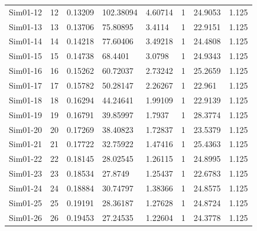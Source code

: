 \documentclass [10pt] {article}
\begin{document}
\begin{table}[H]
\begin{tabular}{c|cllllll}
		Sim01-12 & 12         & 0.13209                         & 102.38094     & 4.60714   & 1              & 24.9053       & 1.125     \\
		Sim01-13 & 13         & 0.13706                         & 75.80895      & 3.4114    & 1              & 22.9151       & 1.125     \\
		Sim01-14 & 14         & 0.14218                         & 77.60406      & 3.49218   & 1              & 24.4808       & 1.125     \\
		Sim01-15 & 15         & 0.14738                         & 68.4401       & 3.0798    & 1              & 24.9343       & 1.125     \\
		Sim01-16 & 16         & 0.15262                         & 60.72037      & 2.73242   & 1              & 25.2659       & 1.125     \\
		Sim01-17 & 17         & 0.15782                         & 50.28147      & 2.26267   & 1              & 22.961        & 1.125     \\
		Sim01-18 & 18         & 0.16294                         & 44.24641      & 1.99109   & 1              & 22.9139       & 1.125     \\
		Sim01-19 & 19         & 0.16791                         & 39.85997      & 1.7937    & 1              & 28.3774       & 1.125     \\
		Sim01-20 & 20         & 0.17269                         & 38.40823      & 1.72837   & 1              & 23.5379       & 1.125     \\
		Sim01-21 & 21         & 0.17722                         & 32.75922      & 1.47416   & 1              & 25.4363       & 1.125     \\
		Sim01-22 & 22         & 0.18145                         & 28.02545      & 1.26115   & 1              & 24.8995       & 1.125     \\
		Sim01-23 & 23         & 0.18534                         & 27.8749       & 1.25437   & 1              & 22.6783       & 1.125     \\
		Sim01-24 & 24         & 0.18884                         & 30.74797      & 1.38366   & 1              & 24.8575       & 1.125     \\
		Sim01-25 & 25         & 0.19191                         & 28.36187      & 1.27628   & 1              & 24.8724       & 1.125     \\
		Sim01-26 & 26         & 0.19453                         & 27.24535      & 1.22604   & 1              & 24.3778       & 1.125     \\

\end{tabular}
\end{table}
\end{document}
